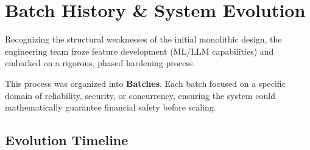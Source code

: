 
\section{Batch History \& System Evolution}

\begin{tcolorbox}[summarybox={\iconGear[1.5] The Hardening Roadmap}]
\color{textdark}
Recognizing the structural weaknesses of the initial monolithic design, the engineering team froze feature development (ML/LLM capabilities) and embarked on a rigorous, phased hardening process.

This process was organized into \textbf{Batches}. Each batch focused on a specific domain of reliability, security, or concurrency, ensuring the system could mathematically guarantee financial safety before scaling.
\end{tcolorbox}

\vspace{0.8cm}

\subsection{Evolution Timeline}

